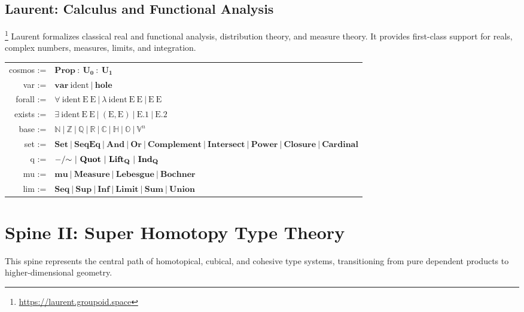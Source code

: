 \documentclass{article}
\theoremstyle{definition}
\theoremstyle{plain}
\begin{document}
\subsection{Laurent: Calculus and Functional Analysis \cite{schwartz50distributions}}\footnote{\url{https://laurent.groupoid.space}}
Laurent formalizes classical real and functional analysis, distribution theory, and measure theory. It provides first-class support for reals, complex numbers, measures, limits, and integration.
\begin{table}[ht!]
\centering
\begin{tabular}{rl}
   cosmos :=&$\mathbf{Prop}\ :\ \mathbf{U_0}\ :\ \mathbf{U_1}$ \\
      var :=&$\mathbf{var}\ \mathrm{ident}\ |\ \mathbf{hole}$ \\
   forall :=&$\forall\ \mathrm{ident}\ \mathrm{E}\ \mathrm{E}\ |\ \lambda\ \mathrm{ident}\ \mathrm{E}\ \mathrm{E}\ |\ \mathrm{E}\ \mathrm{E}$ \\
   exists :=&$\exists\ \mathrm{ident}\ \mathrm{E}\ \mathrm{E}\ |\ (\mathrm{E}, \mathrm{E})\ |\ \mathrm{E}\mathbf{.1}\ |\ \mathrm{E}\mathbf{.2}$ \\
     base :=&$\mathbb{N}\ |\ \mathbb{Z}\ |\ \mathbb{Q}\ |\ \mathbb{R}\ |\ \mathbb{C}\ |\ \mathbb{H}\ |\ \mathbb{O}\ |\ \mathbb{V}^n$ \\
      set :=&$\mathbf{Set}\ |\ \mathbf{SeqEq}\ |\ \mathbf{And}\ |\ \mathbf{Or}\ |\ \mathbf{Complement}\ |\ \mathbf{Intersect}\ |\ \mathbf{Power}\ |\ \mathbf{Closure}\ |\ \mathbf{Cardinal}$ \\
        q :=&$\mathbf{-/\hspace{-1mm}\sim}\ |\ \mathbf{Quot}\ |\ \mathbf{Lift_Q}\ |\ \mathbf{Ind_Q}$ \\
       mu :=&$\mathbf{mu}\ |\ \mathbf{Measure}\ |\ \mathbf{Lebesgue}\ |\ \mathbf{Bochner}$ \\
      lim :=&$\mathbf{Seq}\ |\ \mathbf{Sup}\ |\ \mathbf{Inf}\ |\ \mathbf{Limit}\ |\ \mathbf{Sum}\ |\ \mathbf{Union}$ \\
\end{tabular}
\end{table}

\newpage
\section{Spine II: Super Homotopy Type Theory}
This spine represents the central path of homotopical, cubical, and cohesive type systems, transitioning from pure dependent products to higher-dimensional geometry.
\end{document}
